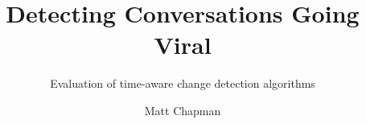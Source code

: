 \documentclass{uvamscse}
\title{Detecting Conversations Going Viral}
\subtitle{Evaluation of time-aware change detection algorithms}
\author{Matt Chapman}
\begin{document}
\nocite{*}
\maketitle



{%
\printbibliography
}
\end{document}
